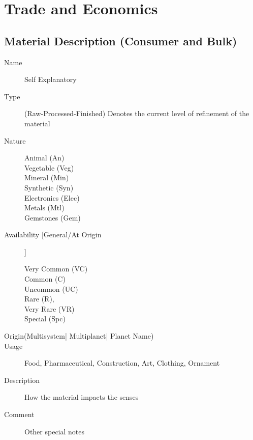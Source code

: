 \chapter{Trade and Economics}

\section{Material Description (Consumer and Bulk) }

\begin{description}
	\item[Name]
	Self Explanatory
	\item[Type]
	(Raw-Processed-Finished)
	Denotes the current level of refinement of the material
	\item[Nature]
	\begin{description}
		\item[Animal (An)]
		\item[Vegetable (Veg)]
		\item[Mineral (Min)]
		\item[Synthetic (Syn)]
		\item[Electronics (Elec)]
		\item[Metals (Mtl)]
		\item[Gemstones (Gem)]
	\end{description}
	\item[Availability [General/At Origin] ]
	\begin{description}
		\item[Very Common (VC)]
		\item[Common (C)]
		\item[Uncommon (UC)]
		\item[Rare (R), ]
		\item[Very Rare (VR)]
		\item[Special (Spc)  ]
	\end{description}
	\item[Origin(Multisystem| Multiplanet| Planet Name)]
	\item[Usage]
	Food, Pharmaceutical, Construction, Art, Clothing, Ornament
	\item[Description]
	How the material impacts the senses
	\item[Comment]
	Other special notes
\end{description}


